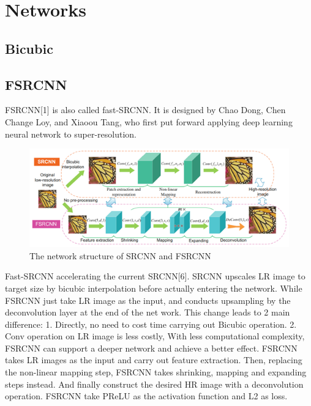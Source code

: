 \documentclass[10pt,twocolumn,letterpaper]{article}
\begin{document}
\section{Networks} 
\subsection{Bicubic}

\subsection{FSRCNN}
FSRCNN[1] is also called fast-SRCNN. 
It is designed by Chao Dong, Chen Change Loy, and Xiaoou Tang, 
who first put forward applying deep learning neural network to super-resolution. 
\begin{figure}[H]
    \centering
    \includegraphics[scale = 0.4]{images/FSRCNN.png}
    \caption{The network structure of SRCNN and FSRCNN}
\end{figure}
Fast-SRCNN accelerating the current SRCNN[6]. SRCNN upscales LR image to target size by bicubic interpolation before actually entering the network. While FSRCNN just take LR image as the input, and conducts upsampling by the deconvolution layer at the end of the net work. This change leads to 2 main difference: 1. Directly, no need to cost time carrying out Bicubic operation. 2. Conv operation on LR image is less costly, With less computational complexity, FSRCNN can support a deeper network and achieve a better effect.
FSRCNN takes LR images as the input and carry out feature extraction. Then, replacing the non-linear mapping step, FSRCNN takes shrinking, mapping and expanding steps instead. And finally construct the desired HR image with a deconvolution operation. 
FSRCNN take PReLU as the activation function and L2 as loss.
\end{document}
